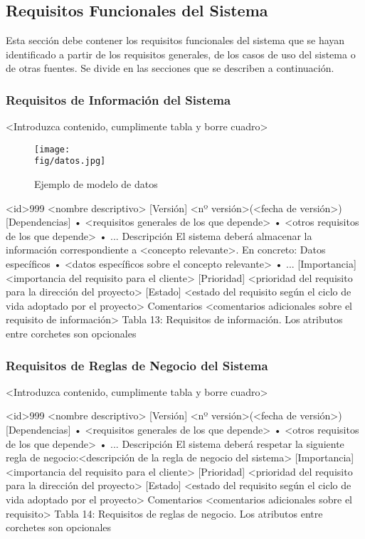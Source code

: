 \subsection{Requisitos Funcionales del Sistema}

\begin{textoazul}
Esta sección debe contener los requisitos funcionales del sistema que se hayan identificado a partir de los requisitos generales, de los casos de uso del sistema o de otras fuentes. Se divide en las secciones que se describen a continuación.
\end{textoazul}
  

            
\subsubsection{Requisitos de Información del Sistema}
<Introduzca contenido, cumplimente tabla y borre cuadro>
 
 
   \begin{figure}[H]
 \centering
\texttt{[image: \\fig/datos.jpg]}
 \caption{Ejemplo de modelo de datos}
 \end{figure}
 

<id>999	<nombre descriptivo>
[Versión]	<nº versión>(<fecha de versión>)
[Dependencias]	•	<requisitos generales de los que depende>
•	<otros requisitos de los que depende>
•	...
Descripción	El sistema deberá almacenar la información correspondiente a <concepto relevante>. En concreto:
Datos específicos	•	<datos específicos sobre el concepto relevante>
•	...
[Importancia]	<importancia del requisito para el cliente>
[Prioridad]	<prioridad del requisito para la dirección del proyecto>
[Estado]	<estado del requisito según el ciclo de vida adoptado por el proyecto>
Comentarios	<comentarios adicionales sobre el requisito de información>
Tabla 13: Requisitos de información.
Los atributos entre corchetes son opcionales


\subsubsection{Requisitos de Reglas de Negocio del Sistema}

<Introduzca contenido, cumplimente tabla y borre cuadro>
 
<id>999	<nombre descriptivo>
[Versión]	<nº versión>(<fecha de versión>)
[Dependencias]	•	<requisitos generales de los que depende>
•	<otros requisitos de los que depende>
•	...
Descripción	El sistema deberá respetar la siguiente regla de negocio:<descripción de la regla de negocio del sistema>
[Importancia]	<importancia del requisito para el cliente>
[Prioridad]	<prioridad del requisito para la dirección del proyecto>
[Estado]	<estado del requisito según el ciclo de vida adoptado por el proyecto>
Comentarios	<comentarios adicionales sobre el requisito>
Tabla 14: Requisitos de reglas de negocio.
Los atributos entre corchetes son opcionales


